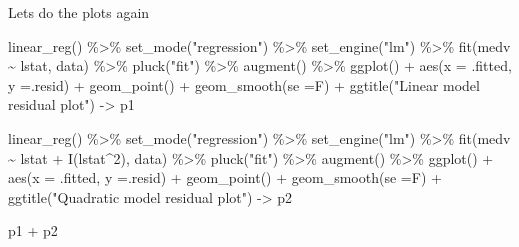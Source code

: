 \documentclass[
  letterpaper,
  DIV=11,
  numbers=noendperiod]{scrreprt}
\newenvironment{Shaded}{\begin{snugshade}}{\end{snugshade}}
\newcommand{\AttributeTok}[1]{\textcolor[rgb]{0.65,0.35,0.00}{#1}}
\newcommand{\DecValTok}[1]{\textcolor[rgb]{0.47,0.16,0.63}{#1}}
\newcommand{\FunctionTok}[1]{\textcolor[rgb]{0.02,0.16,0.49}{#1}}
\newcommand{\NormalTok}[1]{\textcolor[rgb]{0.33,0.33,0.33}{#1}}
\newcommand{\OtherTok}[1]{\textcolor[rgb]{0.85,0.12,0.09}{#1}}
\newcommand{\SpecialCharTok}[1]{\textcolor[rgb]{0.00,0.46,0.62}{#1}}
\newcommand{\StringTok}[1]{\textcolor[rgb]{0.00,0.50,0.00}{#1}}
\begin{document}
Lets do the plots again

\begin{Shaded}
\begin{Highlighting}[]
\FunctionTok{linear\_reg}\NormalTok{() }\SpecialCharTok{\%\textgreater{}\%} 
  \FunctionTok{set\_mode}\NormalTok{(}\StringTok{"regression"}\NormalTok{) }\SpecialCharTok{\%\textgreater{}\%} 
  \FunctionTok{set\_engine}\NormalTok{(}\StringTok{"lm"}\NormalTok{) }\SpecialCharTok{\%\textgreater{}\%} 
  \FunctionTok{fit}\NormalTok{(medv }\SpecialCharTok{\textasciitilde{}}\NormalTok{ lstat, data) }\SpecialCharTok{\%\textgreater{}\%} 
  \FunctionTok{pluck}\NormalTok{(}\StringTok{"fit"}\NormalTok{) }\SpecialCharTok{\%\textgreater{}\%} 
  \FunctionTok{augment}\NormalTok{() }\SpecialCharTok{\%\textgreater{}\%} 
  \FunctionTok{ggplot}\NormalTok{() }\SpecialCharTok{+} \FunctionTok{aes}\NormalTok{(}\AttributeTok{x =}\NormalTok{ .fitted, }\AttributeTok{y =}\NormalTok{.resid) }\SpecialCharTok{+} \FunctionTok{geom\_point}\NormalTok{() }\SpecialCharTok{+} \FunctionTok{geom\_smooth}\NormalTok{(}\AttributeTok{se =}\NormalTok{F) }\SpecialCharTok{+} \FunctionTok{ggtitle}\NormalTok{(}\StringTok{"Linear model residual plot"}\NormalTok{) }\OtherTok{{-}\textgreater{}}\NormalTok{ p1}

\FunctionTok{linear\_reg}\NormalTok{() }\SpecialCharTok{\%\textgreater{}\%} 
  \FunctionTok{set\_mode}\NormalTok{(}\StringTok{"regression"}\NormalTok{) }\SpecialCharTok{\%\textgreater{}\%} 
  \FunctionTok{set\_engine}\NormalTok{(}\StringTok{"lm"}\NormalTok{) }\SpecialCharTok{\%\textgreater{}\%} 
  \FunctionTok{fit}\NormalTok{(medv }\SpecialCharTok{\textasciitilde{}}\NormalTok{ lstat }\SpecialCharTok{+} \FunctionTok{I}\NormalTok{(lstat}\SpecialCharTok{\^{}}\DecValTok{2}\NormalTok{), data) }\SpecialCharTok{\%\textgreater{}\%} 
  \FunctionTok{pluck}\NormalTok{(}\StringTok{"fit"}\NormalTok{) }\SpecialCharTok{\%\textgreater{}\%} 
  \FunctionTok{augment}\NormalTok{() }\SpecialCharTok{\%\textgreater{}\%} 
  \FunctionTok{ggplot}\NormalTok{() }\SpecialCharTok{+} \FunctionTok{aes}\NormalTok{(}\AttributeTok{x =}\NormalTok{ .fitted, }\AttributeTok{y =}\NormalTok{.resid) }\SpecialCharTok{+} \FunctionTok{geom\_point}\NormalTok{() }\SpecialCharTok{+} \FunctionTok{geom\_smooth}\NormalTok{(}\AttributeTok{se =}\NormalTok{F) }\SpecialCharTok{+} \FunctionTok{ggtitle}\NormalTok{(}\StringTok{"Quadratic model residual plot"}\NormalTok{) }\OtherTok{{-}\textgreater{}}\NormalTok{ p2}

\NormalTok{p1 }\SpecialCharTok{+}\NormalTok{ p2}
\end{Highlighting}
\end{Shaded}
\end{document}
